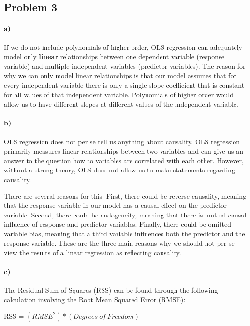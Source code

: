 \documentclass[12pt]{article}\usepackage[]{graphicx}\usepackage[]{color}
\begin{document}
\subsection*{Problem 3}

\paragraph*{a)} If we do not include polynomials of higher order, OLS regression can adequately model only \textbf{linear} relationships between one dependent variable (response variable) and multiple independent variables (predictor variables). The reason for why we can only model linear relationships is that our model assumes that for every independent variable there is only a single slope coefficient that is constant for all values of that independent variable. Polynomials of higher order would allow us to have different slopes at different values of the independent variable.

\paragraph*{b)} OLS regression does not per se tell us anything about causality. OLS regression primarily measures linear relationships between two variables and can give us an answer to the question how to variables are correlated with each other. However, without a strong theory, OLS does not allow us to make statements regarding causality.

There are several reasons for this. First, there could be reverse causality, meaning that the response variable in our model has a causal effect on the predictor variable. Second, there could be endogeneity, meaning that there is mutual causal influence of response and predictor variables. Finally, there could be omitted variable bias, meaning that a third variable influences both the predictor and the response variable. These are the three main reasons why we should not per se view the results of a linear regression as reflecting causality.

\paragraph*{c)} The Residual Sum of Squares (RSS) can be found through the following calculation involving the Root Mean Squared Error (RMSE):

\bigskip

RSS = $(RMSE^2)*(Degrees\ of \ Freedom)$
\end{document}
